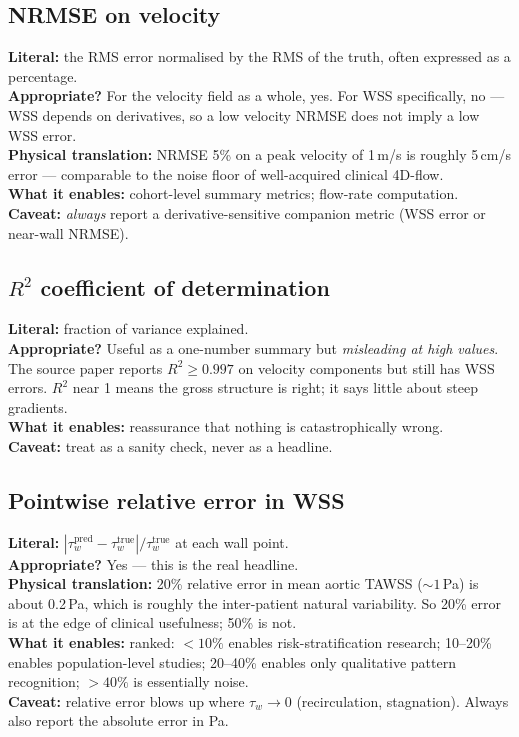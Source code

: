 \documentclass[11pt]{article}
\begin{document}
\subsection*{NRMSE on velocity}
\textbf{Literal:} the RMS error normalised by the RMS of the truth, often expressed as a percentage.\\
\textbf{Appropriate?} For the velocity field as a whole, yes. For WSS specifically, no --- WSS depends on derivatives, so a low velocity NRMSE does not imply a low WSS error.\\
\textbf{Physical translation:} NRMSE 5\% on a peak velocity of 1\,m/s is roughly 5\,cm/s error --- comparable to the noise floor of well-acquired clinical 4D-flow.\\
\textbf{What it enables:} cohort-level summary metrics; flow-rate computation.\\
\textbf{Caveat:} \emph{always} report a derivative-sensitive companion metric (WSS error or near-wall NRMSE).

\subsection*{$R^2$ coefficient of determination}
\textbf{Literal:} fraction of variance explained.\\
\textbf{Appropriate?} Useful as a one-number summary but \emph{misleading at high values}. The source paper reports $R^2 \geq 0.997$ on velocity components but still has WSS errors. $R^2$ near 1 means the gross structure is right; it says little about steep gradients.\\
\textbf{What it enables:} reassurance that nothing is catastrophically wrong.\\
\textbf{Caveat:} treat as a sanity check, never as a headline.

\subsection*{Pointwise relative error in WSS}
\textbf{Literal:} $|\tau_w^{\text{pred}} - \tau_w^{\text{true}}|/\tau_w^{\text{true}}$ at each wall point.\\
\textbf{Appropriate?} Yes --- this is the real headline.\\
\textbf{Physical translation:} 20\% relative error in mean aortic TAWSS ($\sim 1$\,Pa) is about 0.2\,Pa, which is roughly the inter-patient natural variability. So 20\% error is at the edge of clinical usefulness; 50\% is not.\\
\textbf{What it enables:} ranked: $<10\%$ enables risk-stratification research; 10--20\% enables population-level studies; 20--40\% enables only qualitative pattern recognition; $>40\%$ is essentially noise.\\
\textbf{Caveat:} relative error blows up where $\tau_w \to 0$ (recirculation, stagnation). Always also report the absolute error in Pa.
\end{document}
